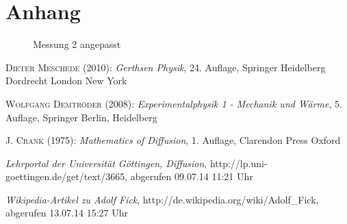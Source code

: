 \documentclass[12pt,a4paper,titlepage,headinclude,bibtotoc]{scrartcl}
\begin{document}
\section{Anhang}
\begin{figure}
	\centering
	
	\caption{Messung 2 angepasst}
	\label{fig:DiffDisk}
\end{figure}

\begin{thebibliography}{100}

	\textsc{Dieter Meschede} (2010): \emph{Gerthsen Physik}, 24. Auflage, Springer Heidelberg
Dordrecht London New York

\textsc{Wolfgang Demtröder} (2008): \emph{Experimentalphysik 1 - Mechanik und Wärme}, 5. Auflage, Springer Berlin, Heidelberg

	\textsc{J. Crank} (1975): \emph{Mathematics of Diffusion}, 1. Auflage, Clarendon Press Oxford

	\emph{Lehrportal der Universität Göttingen, Diffusion},
  http://lp.uni-goettingen.de/get/text/3665, abgerufen 09.07.14 11:21 Uhr
  
	\emph{Wikipedia-Artikel zu Adolf Fick}, http://de.wikipedia.org/wiki/Adolf\_Fick, abgerufen 13.07.14 15:27 Uhr

\end{thebibliography}
\end{document}
